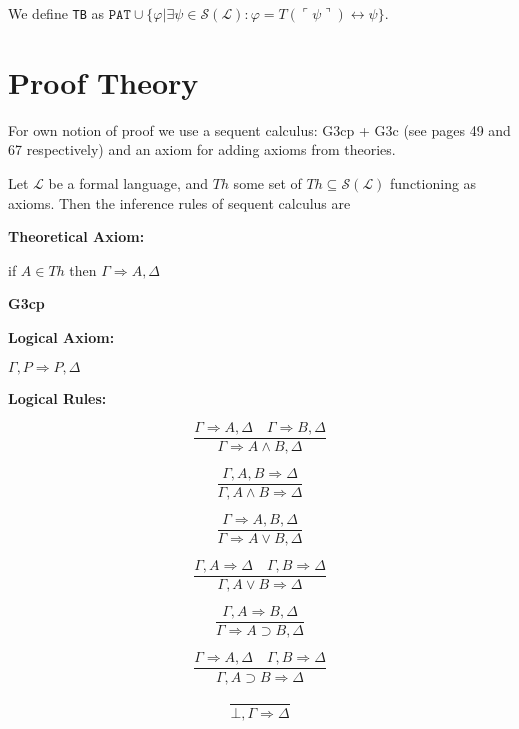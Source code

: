 \begin{definition}[\texttt{TB}]\label{def:TB}
  \leanok
    We define \texttt{TB} as $\texttt{PAT} \cup \{φ | ∃ψ \in \mathcal{S}(\mathcal{L}) : φ = T(⌜ψ⌝) \leftrightarrow ψ\}$.
\end{definition}

\section{Proof Theory}\label{subsec:proof-theory}
For own notion of proof we use a sequent calculus: G3cp + G3c (see \cite{negri:2001} pages 49 and 67 respectively) and an axiom for adding axioms from theories.
\begin{definition}\label{def:Seq-Calc}
    Let $\mathcal{L}$ be a formal language, and $Th$ some set of $Th \subseteq \mathcal{S}(\mathcal{L})$ functioning as axioms. Then the inference rules of sequent calculus are

\noindent \textbf{Theoretical Axiom:}

if $A \in Th$ then $\Gamma \Rightarrow A, \Delta$

\begin{center}
    \textbf{G3cp}
\end{center}
\noindent \textbf{Logical Axiom:}

$\Gamma, P \Rightarrow P, \Delta$

\noindent \textbf{Logical Rules:}
\begin{multicols}{2}
\[
\frac{\Gamma \Rightarrow A, \Delta \quad \Gamma \Rightarrow B, \Delta}{\Gamma \Rightarrow A \land B, \Delta}\tag{$R\land$}
\]

\[
\frac{\Gamma, A, B \Rightarrow \Delta}{\Gamma, A \land B \Rightarrow \Delta}\tag{$L\land$}
\]

\[
\frac{\Gamma \Rightarrow A, B, \Delta}{\Gamma \Rightarrow A \lor B, \Delta}\tag{$R\lor$}
\]

\[
\frac{\Gamma, A \Rightarrow \Delta \quad \Gamma, B \Rightarrow \Delta}{\Gamma, A \lor B \Rightarrow \Delta}\tag{$L\lor$}
\]

\[
\frac{\Gamma, A \Rightarrow B, \Delta}{\Gamma \Rightarrow A \supset B, \Delta}\tag{$R\supset$}
\]

\[
\frac{\Gamma \Rightarrow A, \Delta \quad \Gamma, B \Rightarrow \Delta}{\Gamma, A \supset B \Rightarrow \Delta}\tag{$L\supset$}
\]

\[
\frac{}{\bot, \Gamma \Rightarrow \Delta}\tag{$L\bot$}
\]


\end{multicols}
\end{definition}
